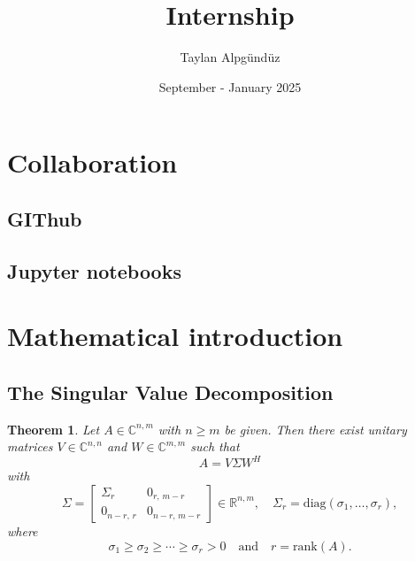 \documentclass{article}
\title{Internship}
\author{Taylan Alpgündüz}
\date{September - January 2025}
\newtheorem{theorem}{Theorem}[section] %
\begin{document}
\maketitle

\vspace{2cm}

\section{Collaboration}

\vspace{1cm}

\subsection{GIThub}

\vspace{1cm}


\vspace{2cm}

\subsection{Jupyter notebooks}

\vspace{1cm}


\vspace{2cm}

\section{Mathematical introduction}

\vspace{1cm}

\subsection{The Singular Value Decomposition}

\vspace{1cm}

\begin{theorem}
Let $A \in \mathbb{C}^{n,m}$ with $n \ge m$ be given.  
Then there exist unitary matrices  
$V \in \mathbb{C}^{n,n}$ and $W \in \mathbb{C}^{m,m}$ such that  
\[
A = V \Sigma W^H
\]
with
\[
\Sigma =
\begin{bmatrix}
\Sigma_r & 0_{r,\,m-r} \\
0_{n-r,\,r} & 0_{n-r,\,m-r}
\end{bmatrix}
\in \mathbb{R}^{n,m},
\quad
\Sigma_r = \mathrm{diag}(\sigma_1, \dots, \sigma_r),
\]
where
\[
\sigma_1 \ge \sigma_2 \ge \cdots \ge \sigma_r > 0
\quad\text{and}\quad
r = \mathrm{rank}(A).
\]
\end{theorem}
\end{document}
